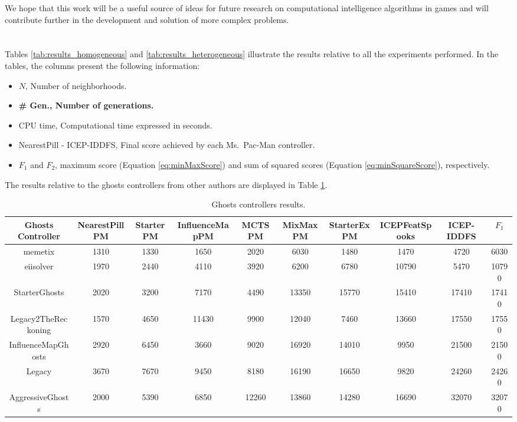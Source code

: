 \documentclass[journal]{IEEEtran}
\begin{document}
We hope that this work will be a useful source of ideas for future research on computational intelligence algorithms in games and will contribute further in the development and solution of more complex problems.

\appendices
\section{}
\label{sec:CompleteResults}
Tables \ref{tab:results_homogeneous} and \ref{tab:results_heterogeneous} illustrate the results relative to all the experiments performed. In the tables, the columns present the following information: 

\begin{itemize}
  \item $N$, Number of neighborhoods.
  \item \textbf{\# Gen., Number of generations.}
  \item CPU time, Computational time expressed in seconds.
  \item NearestPill - ICEP-IDDFS, Final score achieved by each Ms.\  Pac-Man controller.
  \item $F_1$ and $F_2$, maximum score (Equation \eqref{eq:minMaxScore}) and sum of squared scores (Equation \eqref{eq:minSquareScore}), respectively.
\end{itemize}

The results relative to the ghosts controllers from other authors are displayed in Table \ref{tab:results_ghosts}.

\begin{table}
\caption{Ghosts controllers results.}
\label{tab:results_ghosts}
\centering
\footnotesize
\begin{tabular}{|c|cccccccc|c|}
\hline
Ghosts Controller & NearestPillPM & StarterPM & InfluenceMapPM & MCTSPM & MixMaxPM & StarterExPM & ICEPFeatSpooks & ICEP-IDDFS & $F_1$ \\
\hline
memetix \cite{Tose2012}	&	1310	&	1330	&	1650	&	2020	&	6030	&	1480	&	1470	&	4720	&	6030 \\
eiisolver \cite{Verhaard}	&	1970	&	2440	&	4110	&	3920	&	6200	&	6780	&	10790	&	5470	&	10790	\\
StarterGhosts	&	2020	&	3200	&	7170	&	4490	&	13350	&	15770	&	15410	&	17410	&	17410	\\
Legacy2TheReckoning	&	1570	&	4650	&	11430	&	9900	&	12040	&	7460	&	13660	&	17550	&	17550	\\
InfluenceMapGhosts	\cite{Svensson2012} &	2920	&	6450	&	3660	&	9020	&	16920	&	14010	&	9950	&	21500	&	21500	\\
Legacy	&	3670	&	7670	&	9450	&	8180	&	16190	&	16650	&	9820	&	24260	&	24260	\\
AggressiveGhosts	&	2000	&	5390	&	6850	&	12260	&	13860	&	14280	&	16690	&	32070	&	32070	\\
\hline
\end{tabular}
\end{table}
\end{document}
